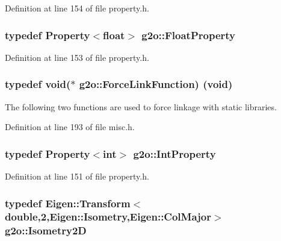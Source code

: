Definition at line 154 of file property.\+h.

\subsubsection[{\texorpdfstring{Float\+Property}{FloatProperty}}]{\setlength{\rightskip}{0pt plus 5cm}typedef {\bf Property}$<$float$>$ {\bf g2o\+::\+Float\+Property}}\hypertarget{namespaceg2o_af8e55b06b00e915fcf0475b00acea270}{}\label{namespaceg2o_af8e55b06b00e915fcf0475b00acea270}


Definition at line 153 of file property.\+h.

\subsubsection[{\texorpdfstring{Force\+Link\+Function}{ForceLinkFunction}}]{\setlength{\rightskip}{0pt plus 5cm}typedef void($\ast$  g2o\+::\+Force\+Link\+Function) (void)}\hypertarget{namespaceg2o_a3be76fea59d320255e89425439f18f48}{}\label{namespaceg2o_a3be76fea59d320255e89425439f18f48}
The following two functions are used to force linkage with static libraries. 

Definition at line 193 of file misc.\+h.

\subsubsection[{\texorpdfstring{Int\+Property}{IntProperty}}]{\setlength{\rightskip}{0pt plus 5cm}typedef {\bf Property}$<$int$>$ {\bf g2o\+::\+Int\+Property}}\hypertarget{namespaceg2o_aa44e64803eabdb592175e27f1e3ebf59}{}\label{namespaceg2o_aa44e64803eabdb592175e27f1e3ebf59}


Definition at line 151 of file property.\+h.

\subsubsection[{\texorpdfstring{Isometry2D}{Isometry2D}}]{\setlength{\rightskip}{0pt plus 5cm}typedef Eigen\+::\+Transform$<$double,2,Eigen\+::\+Isometry,Eigen\+::\+Col\+Major$>$ {\bf g2o\+::\+Isometry2D}}\hypertarget{namespaceg2o_a24614fc78fff981b779fbf4850b19101}{}\label{namespaceg2o_a24614fc78fff981b779fbf4850b19101}


